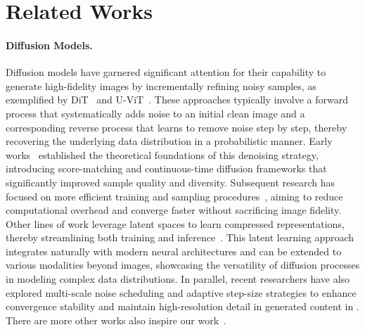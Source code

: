 \section{Related Works}

\paragraph{Diffusion Models.} Diffusion models have garnered significant attention for their capability to generate high-fidelity images by incrementally refining noisy samples, as exemplified by DiT~\cite{px23} and U-ViT~\cite{bnx+23}. These approaches typically involve a forward process that systematically adds noise to an initial clean image and a corresponding reverse process that learns to remove noise step by step, thereby recovering the underlying data distribution in a probabilistic manner. Early works~\cite{se19,sme20} established the theoretical foundations of this denoising strategy, introducing score-matching and continuous-time diffusion frameworks that significantly improved sample quality and diversity. Subsequent research has focused on more efficient training and sampling procedures~\cite{lzb+22,ssz+24_dit,ssz+24_pruning}, aiming to reduce computational overhead and converge faster without sacrificing image fidelity. Other lines of work leverage latent spaces to learn compressed representations, thereby streamlining both training and inference~\cite{rbl+22,hwsl24}. This latent learning approach integrates naturally with modern neural architectures and can be extended to various modalities beyond images, showcasing the versatility of diffusion processes in modeling complex data distributions. In parallel, recent researchers have also explored multi-scale noise scheduling and adaptive step-size strategies to enhance convergence stability and maintain high-resolution detail in generated content in \cite{lkw+24,fmzz24,rckc24,jzx+25,lyhz24}. There are more other works also inspire our work~\cite{xzc+22,dwb+23,pbd+23,wsd+23,wcz+23,ssz+24,ssz+24_prun,wxz+24,cl24,kkn24,cll+25,cll+25_deskreject,cxj24,wcy+23,fjl+24,lzw+24,hwl+24}.

